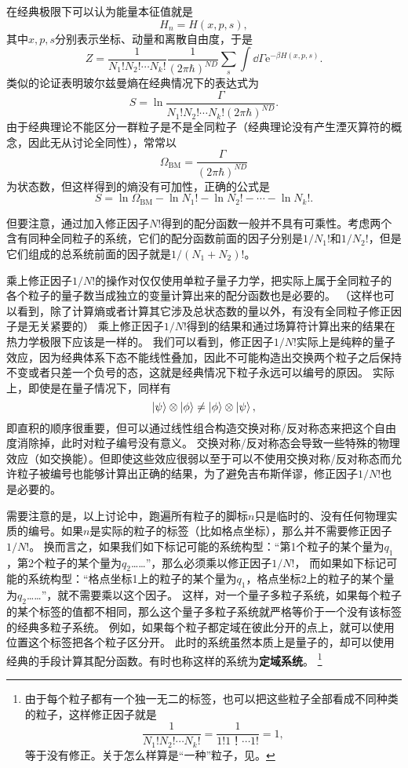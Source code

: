 \documentclass[hyperref, UTF8, a4paper]{ctexart}
\newcommand*{\ee}{\mathrm{e}}
\renewcommand{\autoref}{\prettyref}
\begin{document}
在经典极限下可以认为能量本征值就是
\[
    H_n = H(x, p, s),
\]
其中$x, p, s$分别表示坐标、动量和离散自由度，于是
\begin{equation}
    Z = \frac{1}{N_1! N_2! \cdots N_k!} \frac{1}{(2\pi \hbar)^{ND}} \sum_{s} \int \dd{\Gamma} \ee^{-\beta H(x, p, s)}.
\end{equation}
类似的论证表明玻尔兹曼熵在经典情况下的表达式为
\begin{equation}
    S = \ln \frac{\Gamma}{N_1! N_2! \cdots N_k! (2\pi\hbar)^{ND}}.
\end{equation}
由于经典理论不能区分一群粒子是不是全同粒子（经典理论没有产生湮灭算符的概念，因此无从讨论全同性），常常以
\begin{equation}
    \Omega_\text{BM} = \frac{\Gamma}{(2\pi\hbar)^{ND}}
\end{equation}
为状态数，但这样得到的熵没有可加性，正确的公式是
\[
    S = \ln \Omega_\text{BM} - \ln N_1! - \ln N_2! - \cdots - \ln N_k!.
\]

但要注意，通过加入修正因子$N!$得到的配分函数一般并不具有可乘性。考虑两个含有同种全同粒子的系统，它们的配分函数前面的因子分别是$1/N_1!$和$1/N_2!$，但是它们组成的总系统前面的因子就是$1/(N_1+N_2)!$。

乘上修正因子$1/N!$的操作对仅仅使用单粒子量子力学，把实际上属于全同粒子的各个粒子的量子数当成独立的变量计算出来的配分函数也是必要的。
（这样也可以看到，除了计算熵或者计算其它涉及总状态数的量以外，有没有全同粒子修正因子是无关紧要的）
乘上修正因子$1/N!$得到的结果和通过场算符计算出来的结果在热力学极限下应该是一样的。
我们可以看到，修正因子$1/N!$实际上是纯粹的量子效应，因为经典体系下态不能线性叠加，因此不可能构造出交换两个粒子之后保持不变或者只差一个负号的态，这就是经典情况下粒子永远可以编号的原因。
实际上，即使是在量子情况下，同样有
\[
    \ket{\psi} \otimes \ket{\phi} \neq \ket{\phi} \otimes \ket{\psi},
\]
即直积的顺序很重要，但可以通过线性组合构造交换对称/反对称态来把这个自由度消除掉，此时对粒子编号没有意义。
交换对称/反对称态会导致一些特殊的物理效应（如交换能）。但即使这些效应很弱以至于可以不使用交换对称/反对称态而允许粒子被编号也能够计算出正确的结果，为了避免吉布斯佯谬，修正因子$1/N!$也是必要的。

需要注意的是，以上讨论中，跑遍所有粒子的脚标$n$只是临时的、没有任何物理实质的编号。如果$n$是实际的粒子的标签（比如格点坐标），那么并不需要修正因子$1/N!$。
换而言之，如果我们如下标记可能的系统构型：“第1个粒子的某个量为$q_1$，第2个粒子的某个量为$q_2$……”，那么必须乘以修正因子$1/N!$，
而如果如下标记可能的系统构型：“格点坐标1上的粒子的某个量为$q_1$，格点坐标2上的粒子的某个量为$q_2$……”，就不需要乘以这个因子。
这样，对一个量子多粒子系统，如果每个粒子的某个标签的值都不相同，那么这个量子多粒子系统就严格等价于一个没有该标签的经典多粒子系统。
例如，如果每个粒子都定域在彼此分开的点上，就可以使用位置这个标签把各个粒子区分开。
此时的系统虽然本质上是量子的，却可以使用经典的手段计算其配分函数。有时也称这样的系统为\textbf{定域系统}。%
\footnote{由于每个粒子都有一个独一无二的标签，也可以把这些粒子全部看成不同种类的粒子，这样修正因子就是
\[
    \frac{1}{N_1! N_2! \cdots N_k!} = \frac{1}{1! 1！ \cdots 1!} = 1,
\]
等于没有修正。关于怎么样算是“一种”粒子，见\autoref{note:one-kind-of-particle}。
}
\end{document}
